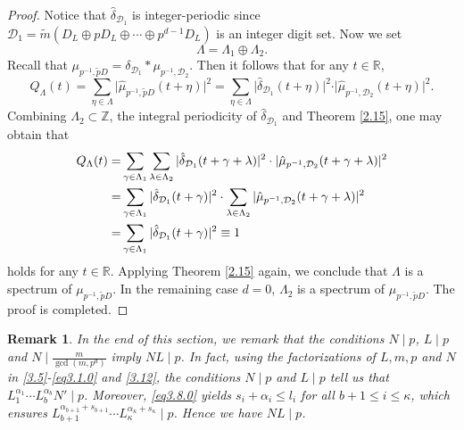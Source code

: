 \documentclass[11pt]{article}
\newtheorem{remark}{Remark}[section]
\numberwithin{equation}{section}
\begin{document}
\begin{proof}
	Notice that $\hat{\delta}_{\mathcal {D}_1}$ is integer-periodic since
	$\mathcal {D}_1=\tilde{m}(D_{L}\oplus pD_{L}\oplus\cdots\oplus p^{d-1} D_{L})$ is an integer digit set. Now we set
	$$
	\Lambda=\Lambda_1 \oplus\Lambda_2.
	$$
	Recall that $\mu_{p^{-1}, \tilde{p}D}=\delta_{\mathcal {D}_1} \ast \mu_{p^{-1},\mathcal {D}_2}$. Then it follows that for any $t\in\mathbb{R}$,
	$$
	Q_{\Lambda}(t)=\sum_{\eta \in \Lambda} \vert \hat{\mu}_{p^{-1}, \tilde{p}D}(t+\eta) \vert ^2 = \sum_{\eta \in \Lambda} \vert \hat{\delta}_{\mathcal {D}_1}(t+\eta) \vert ^2 \cdot \vert \hat{\mu}_{p^{-1},\mathcal {D}_2}(t+\eta) \vert ^2.
	$$
	Combining $\Lambda_2\subset\mathbb{Z}$, the integral periodicity of $\hat{\delta}_{\mathcal {D}_1}$ and  Theorem \ref{2.15}, one may obtain that
	\begin{align*}
		Q_{\Lambda}(t)=& \sum_{\gamma \in \Lambda_1}\sum_{\lambda \in \Lambda_2} \vert \hat{\delta}_{\mathcal {D}_1}(t+\gamma+\lambda) \vert ^2 \cdot \vert \hat{\mu}_{p^{-1},\mathcal {D}_2}(t+\gamma+\lambda) \vert ^2  \notag \\
		=& \sum_{\gamma \in \Lambda_1} \vert \hat{\delta}_{\mathcal {D}_1}(t+\gamma) \vert ^2 \cdot \sum_{\lambda \in \Lambda_2} \vert \hat{\mu}_{p^{-1},\mathcal {D}_2}(t+\gamma+\lambda) \vert ^2  \notag \\
		=& \sum_{\gamma \in \Lambda_1} \vert \hat{\delta}_{\mathcal {D}_1}(t+\gamma) \vert ^2 \equiv 1
	\end{align*}
	holds for any $t \in \mathbb{R}$. Applying Theorem \ref{2.15} again, we conclude that
	$\Lambda$ is a spectrum of $\mu_{p^{-1}, \tilde{p}D}$.
In the remaining case $d=0$, $\Lambda_2$ is a spectrum of $\mu_{p^{-1}, \tilde{p}D}$.
The proof is completed.
	
\end{proof}


\begin{remark}\label{rem3.1}
	{\rm 
In the end of this section, we remark that the conditions $N\mid p$, $L\mid p$ and $N\mid \frac{m}{\gcd(m,p^d)}$ imply $NL\mid p$. In fact, using the factorizations of $L,m,p$ and $N$ in \eqref{3.5}-\eqref{eq3.1.0} and \eqref{3.12}, the conditions $N\mid p$ and $L\mid p$ tell us that $L_1^{\alpha_1} \cdots L_b^{\alpha_b}N'\mid p$. 
Moreover, \eqref{eq3.8.0} yields $s_i + \alpha_i \leq l_i$  for all  $b+1 \leq i \leq \kappa$, which ensures $L_{b+1}^{\alpha_{b+1}+s_{b+1}} \cdots L_{\kappa}^{\alpha_{\kappa}+s_{\kappa}} \mid p$. Hence we have $NL \mid p$.
}
\end{remark}
\end{document}
